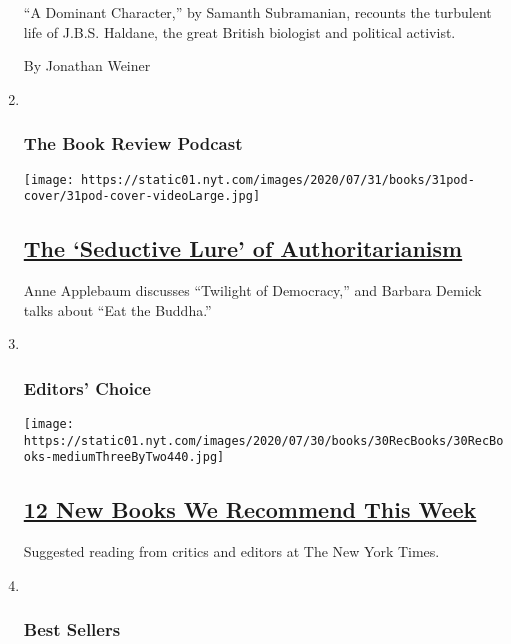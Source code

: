 \begin{enumerate}
  ``A Dominant Character,'' by Samanth Subramanian, recounts the
  turbulent life of J.B.S. Haldane, the great British biologist and
  political activist.

  By Jonathan Weiner
\item ~
  \hypertarget{the-book-review-podcast}{%
  \subsubsection{The Book Review
  Podcast}\label{the-book-review-podcast}}

  \texttt{[image: https://static01.nyt.com/images/2020/07/31/books/31pod-cover/31pod-cover-videoLarge.jpg]}

  \hypertarget{the-seductive-lure-of-authoritarianism}{%
  \subsection{\texorpdfstring{\href{/2020/07/31/books/review/podcast-twilight-democracy-anne-applebaum-eat-buddha-barbara-demick.html}{The
  `Seductive Lure' of
  Authoritarianism}}{The `Seductive Lure' of Authoritarianism}}\label{the-seductive-lure-of-authoritarianism}}

  Anne Applebaum discusses ``Twilight of Democracy,'' and Barbara Demick
  talks about ``Eat the Buddha.''
\item ~
  \hypertarget{editors-choice}{%
  \subsubsection{Editors' Choice}\label{editors-choice}}

  \texttt{[image: https://static01.nyt.com/images/2020/07/30/books/30RecBooks/30RecBooks-mediumThreeByTwo440.jpg]}

  \hypertarget{12-new-books-we-recommend-this-week}{%
  \subsection{\texorpdfstring{\href{/2020/07/30/books/review/12-new-books-we-recommend-this-week.html}{12
  New Books We Recommend This
  Week}}{12 New Books We Recommend This Week}}\label{12-new-books-we-recommend-this-week}}

  Suggested reading from critics and editors at The New York Times.
\item ~
  \hypertarget{best-sellers}{%
  \subsubsection{Best Sellers}\label{best-sellers}}


\end{enumerate}
